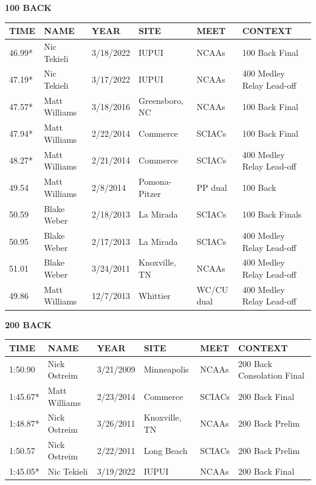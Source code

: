 \begin{table}[H]
\centering
\begin{minipage}[t]{0.48\textwidth}
\centering
\textbf{100 BACK}\\[0.1cm]
\begin{tabular}{@{}p{1.8cm}p{2.8cm}p{1.2cm}p{1.4cm}p{1.4cm}p{2.0cm}@{}}
\hline
    \textbf{TIME} & \textbf{NAME} & \textbf{YEAR} & \textbf{SITE} & \textbf{MEET} & \textbf{CONTEXT} \\
\hline
    46.99* & Nic Tekieli & 3/18/2022 & IUPUI & NCAAs & 100 Back Final \\
    47.19* & Nic Tekieli & 3/17/2022 & IUPUI & NCAAs & 400 Medley Relay Lead-off \\
    47.57* & Matt Williams & 3/18/2016 & Greensboro, NC & NCAAs & 100 Back Final \\
    47.94* & Matt Williams & 2/22/2014 & Commerce & SCIACs & 100 Back Final \\
    48.27* & Matt Williams & 2/21/2014 & Commerce & SCIACs & 400 Medley Relay Lead-off \\
    49.54 & Matt Williams & 2/8/2014 & Pomona-Pitzer & PP dual & 100 Back \\
    50.59 & Blake Weber & 2/18/2013 & La Mirada & SCIACs & 100 Back Finals \\
    50.95 & Blake Weber & 2/17/2013 & La Mirada & SCIACs & 400 Medley Relay Lead-off \\
    51.01 & Blake Weber & 3/24/2011 & Knoxville, TN & NCAAs & 400 Medley Relay Lead-off \\
    49.86 & Matt Williams & 12/7/2013 & Whittier & WC/CU dual & 400 Medley Relay Lead-off \\
\hline
\end{tabular}
\end{minipage}\hfill
\begin{minipage}[t]{0.48\textwidth}
\centering
\textbf{200 BACK}\\[0.1cm]
\begin{tabular}{@{}p{1.8cm}p{2.8cm}p{1.2cm}p{1.4cm}p{1.4cm}p{2.0cm}@{}}
\hline
    \textbf{TIME} & \textbf{NAME} & \textbf{YEAR} & \textbf{SITE} & \textbf{MEET} & \textbf{CONTEXT} \\
\hline
    1:50.90 & Nick Ostreim & 3/21/2009 & Minneapolis & NCAAs & 200 Back Consolation Final \\
    1:45.67* & Matt Williams & 2/23/2014 & Commerce & SCIACs & 200 Back Final \\
    1:48.87* & Nick Ostreim & 3/26/2011 & Knoxville, TN & NCAAs & 200 Back Prelim \\
    1:50.57 & Nick Ostreim & 2/22/2011 & Long Beach & SCIACs & 200 Back Prelim \\
    1:45.05* & Nic Tekieli & 3/19/2022 & IUPUI & NCAAs & 200 Back Final \\
\hline
\end{tabular}
\end{minipage}
\end{table}

